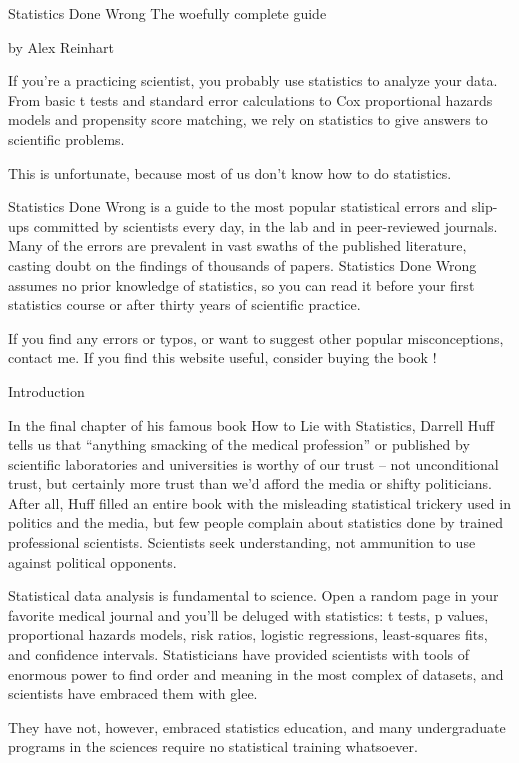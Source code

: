 Statistics Done Wrong
The woefully complete guide

by Alex Reinhart

If you’re a practicing scientist, you probably use statistics to analyze your data. From basic t tests and standard error calculations to Cox proportional hazards models and propensity score matching, we rely on statistics to give answers to scientific problems.

This is unfortunate, because most of us don’t know how to do statistics.

Statistics Done Wrong is a guide to the most popular statistical errors and slip-ups committed by scientists every day, in the lab and in peer-reviewed journals. Many of the errors are prevalent in vast swaths of the published literature, casting doubt on the findings of thousands of papers. Statistics Done Wrong assumes no prior knowledge of statistics, so you can read it before your first statistics course or after thirty years of scientific practice.

If you find any errors or typos, or want to suggest other popular misconceptions, contact me. If you find this website useful, consider buying the book !


Introduction

In the final chapter of his famous book How to Lie with Statistics, Darrell Huff tells us that “anything smacking of the medical profession” or published by scientific laboratories and universities is worthy of our trust – not unconditional trust, but certainly more trust than we’d afford the media or shifty politicians. After all, Huff filled an entire book with the misleading statistical trickery used in politics and the media, but few people complain about statistics done by trained professional scientists. Scientists seek understanding, not ammunition to use against political opponents.

Statistical data analysis is fundamental to science. Open a random page in your favorite medical journal and you’ll be deluged with statistics: t tests, p values, proportional hazards models, risk ratios, logistic regressions, least-squares fits, and confidence intervals. Statisticians have provided scientists with tools of enormous power to find order and meaning in the most complex of datasets, and scientists have embraced them with glee.

They have not, however, embraced statistics education, and many undergraduate programs in the sciences require no statistical training whatsoever.

